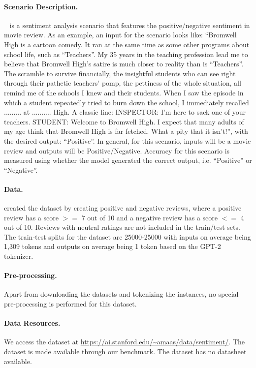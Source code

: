 \paragraph{Scenario Description.}
\imdb~\citep{maas2011imdb} is a sentiment analysis scenario that features the positive/negative sentiment in movie review.
As an example, an input for the scenario looks like: ``Bromwell High is a cartoon comedy. It ran at the same time as some other programs about school life, such as ``Teachers''. My 35 years in the teaching profession lead me to believe that Bromwell High's satire is much closer to reality than is ``Teachers''. The scramble to survive financially, the insightful students who can see right through their pathetic teachers' pomp, the pettiness of the whole situation, all remind me of the schools I knew and their students. When I saw the episode in which a student repeatedly tried to burn down the school, I immediately recalled ......... at .......... High. A classic line: INSPECTOR: I'm here to sack one of your teachers. STUDENT: Welcome to Bromwell High. I expect that many adults of my age think that Bromwell High is far fetched. What a pity that it isn't!'', with the desired output: ``Positive''.
In general, for this scenario, inputs will be a movie review and outputs will be Positive/Negative.
Accuracy for this scenario is measured using whether the model generated the correct output, i.e. ``Positive'' or ``Negative''. 

\paragraph{Data.}
\citet{maas2011imdb} created the dataset by creating positive and negative reviews, where a positive review has a score $>=$ 7 out of 10 and a negative review has a score $<=$ 4 out of 10. 
Reviews with neutral ratings are not included in the train/test sets. 
The train-test splits for the dataset are 25000-25000 with inputs on average being 1,309 tokens and outputs on average being 1 token based on the GPT-2 tokenizer.
\paragraph{Pre-processing.}
Apart from downloading the datasets and tokenizing the instances, no special pre-processing is performed for this dataset. 

\paragraph{Data Resources.}
We access the dataset at \url{https://ai.stanford.edu/~amaas/data/sentiment/}.
The dataset is made available through our benchmark. The dataset has no datasheet available.

